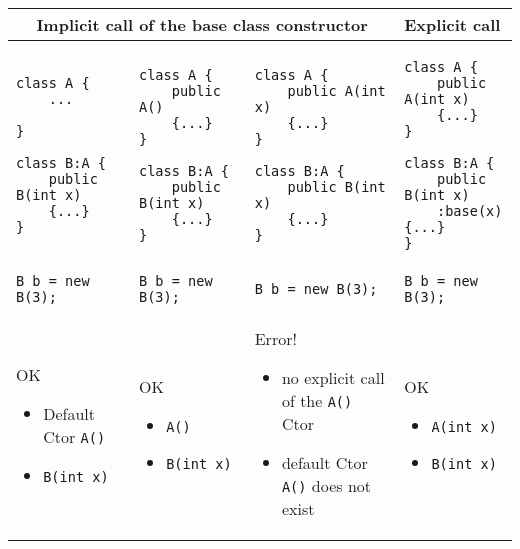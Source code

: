 \begin{table}[h!]
\lstset{numbers=none, tabsize=3, frame=None}
\centering
{}
\begin{tabular}{|p{4cm}|p{4cm}|p{4cm}|p{4cm}|}
\hline
\multicolumn{3}{|c|}{Implicit call of the base class constructor} & Explicit call
\\ \hline
\begin{lstlisting}
class A {
	...

}

class B:A {
	public B(int x) 
	{...}
}
\end{lstlisting} &
\begin{lstlisting}
class A { 
	public A() 
	{...}
}

class B:A {
	public B(int x) 
	{...}
}
\end{lstlisting} &
\begin{lstlisting}
class A { 
	public A(int x) 
	{...}
}

class B:A {
	public B(int x) 
	{...}
}
\end{lstlisting} &
\begin{lstlisting}
class A { 
	public A(int x) 
	{...}
}

class B:A {
	public B(int x)
	:base(x) {...}
}
\end{lstlisting}
\\ \hline
\lstinline!B b = new B(3);! & \lstinline!B b = new B(3);! & \lstinline!B b = new B(3);! & \lstinline!B b = new B(3);!
\\ \hline
OK
\begin{itemize}
	\item Default Ctor \lstinline!A()!
	\item \lstinline!B(int x)!
\end{itemize}& 
OK
\begin{itemize}
	\item \lstinline!A()!
	\item \lstinline!B(int x)!
\end{itemize}& 
Error!
\begin{itemize}
	\item no explicit call of the \lstinline!A()! Ctor
	\item default Ctor \lstinline!A()! does not exist
\end{itemize}& 
OK
\begin{itemize}
	\item \lstinline!A(int x)!
	\item \lstinline!B(int x)!
\end{itemize}
\\ \hline
\end{tabular}
\end{table}


